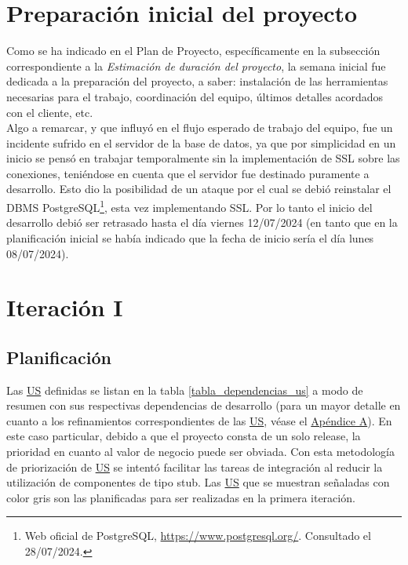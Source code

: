 \documentclass[a4paper, 12pt,twoside]{report}  %
\numberwithin{equation}{subsection} %
\begin{document}
\section{Preparación inicial del proyecto}
\indent Como se ha indicado en el Plan de Proyecto, específicamente en la subsección correspondiente a la \textit{Estimación de duración del proyecto}, la semana inicial fue dedicada a la preparación del proyecto, a saber: instalación de las herramientas necesarias para el trabajo, coordinación del equipo, últimos detalles acordados con el cliente, etc.\\
\indent Algo a remarcar, y que influyó en el flujo esperado de trabajo del equipo, fue un incidente sufrido en el servidor de la base de datos, ya que por simplicidad en un inicio se pensó en trabajar temporalmente sin la implementación de SSL sobre las conexiones, teniéndose en cuenta que el servidor fue destinado puramente a desarrollo. Esto dio la posibilidad de un ataque por el cual se debió reinstalar el DBMS PostgreSQL\footnote{Web oficial de PostgreSQL, \url{https://www.postgresql.org/}. Consultado el 28/07/2024.}, esta vez implementando SSL. Por lo tanto el inicio del desarrollo debió ser retrasado hasta el día viernes 12/07/2024 (en tanto que en la planificación inicial se había indicado que la fecha de inicio sería el día lunes 08/07/2024).

\section{Iteración I}
\subsection{Planificación}
Las \hyperlink{US}{US} definidas se listan en la tabla \ref{tabla_dependencias_us} a modo de resumen con sus respectivas dependencias de desarrollo (para un mayor detalle en cuanto a los refinamientos correspondientes de las \hyperlink{US}{US}, véase el \hyperlink{apendice_a}{Apéndice A}). En este caso particular, debido a que el proyecto consta de un solo release, la prioridad en cuanto al valor de negocio puede ser obviada. Con esta metodología de priorización de \hyperlink{US}{US} se intentó facilitar las tareas de integración al reducir la utilización de componentes de tipo stub. Las \hyperlink{US}{US} que se muestran señaladas con color gris son las planificadas para ser realizadas en la primera iteración.
\end{document}
